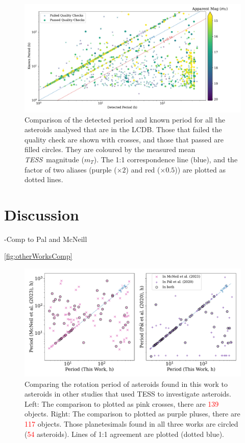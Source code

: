 \documentclass[12pt]{article}
\newcommand{\tess}{\textit{TESS}}
\newcommand{\red}[1]{\textcolor{red}{#1}}
\begin{document}
\begin{figure}
    \centering
    \includegraphics[width=\textwidth]{LCDBCompTotalPaperFigDraft.pdf}
    \caption{Comparison of the detected period and known period for all the asteroids analysed that are in the LCDB.
    Those that failed the quality check are shown with crosses, and those that passed are filled circles. They are coloured by the measured mean \tess\ magnitude ($m_T$).
    The 1:1 correspondence line (blue), and the factor of two aliases (purple ($\times 2$) and red ($\times 0.5$)) are plotted as dotted lines.
    }
    \label{fig:LCDBComp}
\end{figure}



\section{Discussion} \label{sec:Dis}

-Comp to Pal and McNeill

\autoref{fig:otherWorksComp}

\begin{figure}
    \centering
    \includegraphics[width=\textwidth]{M23andP20CompPaperFigDraft.pdf}
    \caption{Comparing the rotation period of asteroids found in this work to asteroids in other studies that used TESS to investigate asteroids. 
    Left: The comparison to \citet{McNeill2023} plotted as pink crosses, there are \red{139} objects.
    Right: The comparison to \citet{Pal2020} plotted as purple pluses, there are \red{117} objects. 
    Those planetesimals found in all three works are circled (\red{54} asteroids).
    Lines of 1:1 agreement are plotted (dotted blue).}
    \label{fig:otherWorksComp}
\end{figure}
\end{document}
